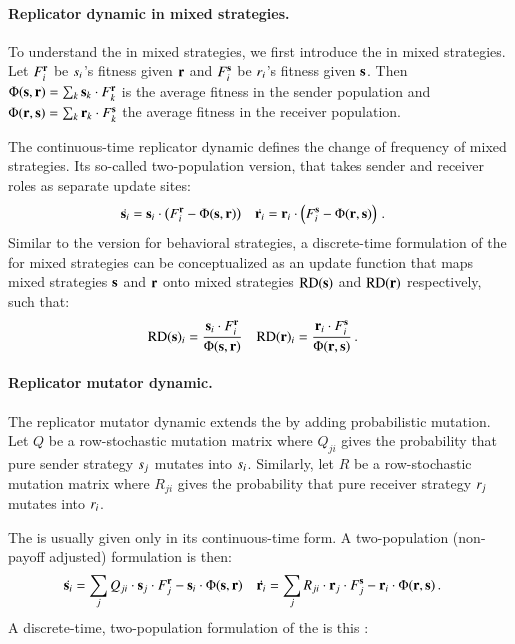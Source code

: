 \paragraph{Replicator dynamic in mixed strategies.} To understand the
\rmd in mixed strategies, we first introduce the \rd in mixed
strategies. Let $F_i^{\mathrm{\mathbf{r}}}$ be $s_i$'s fitness given
$\mathrm{\mathbf{r}}$ and $F_i^{\mathrm{\mathbf{s}}}$ be $r_i$'s fitness given
$\mathrm{\mathbf{s}}$. Then $\Phi(\mathrm{\mathbf{s}},\mathrm{\mathbf{r}}) = \sum_{k} \mathrm{\mathbf{s}}_k \cdot
F_k^{\mathrm{\mathbf{r}}}$ is the average fitness in the sender population and
$\Phi(\mathrm{\mathbf{r}},\mathrm{\mathbf{s}}) = \sum_{k} \mathrm{\mathbf{r}}_k \cdot F_k^{\mathrm{\mathbf{s}}}$ the
average fitness in the receiver population.

The continuous-time replicator dynamic defines the change of frequency
of mixed strategies. Its so-called two-population version, that takes
sender and receiver roles as separate update sites:
\begin{align*}
  \dot{\mathrm{\mathbf{s}}_i} & = \mathrm{\mathbf{s}}_i \cdot \left ( F_i^{\mathrm{\mathbf{r}}} -
  \Phi(\mathrm{\mathbf{s}},\mathrm{\mathbf{r}}) \right ) &   \dot{\mathrm{\mathbf{r}}_i} &  = \mathrm{\mathbf{r}}_i \cdot \left ( F_i^{\mathrm{\mathbf{s}}} -
  \Phi(\mathrm{\mathbf{r}},\mathrm{\mathbf{s}}) \right ) \,.
\end{align*}
Similar to the version for behavioral strategies, a discrete-time
formulation of the \rd for mixed strategies can be conceptualized as an
update function that maps mixed strategies $\mathrm{\mathbf{s}}$ and $\mathrm{\mathbf{r}}$
onto mixed strategies $\mathrm{RD}(\mathrm{\mathbf{s}})$ and $\mathrm{RD}(\mathrm{\mathbf{r}})$ respectively,
such that:
\begin{align*}
  \mathrm{RD}(\mathrm{\mathbf{s}})_i & = \frac{\mathrm{\mathbf{s}}_i \cdot F_i^{\mathrm{\mathbf{r}}}}{
    \Phi(\mathrm{\mathbf{s}},\mathrm{\mathbf{r}})} & \mathrm{RD}(\mathrm{\mathbf{r}})_i & = \frac{\mathrm{\mathbf{r}}_i \cdot
    F_i^{\mathrm{\mathbf{s}}}}{ \Phi(\mathrm{\mathbf{r}},\mathrm{\mathbf{s}})} \,.
\end{align*}


\paragraph{Replicator mutator dynamic.} The replicator mutator dynamic
extends the \rd by adding probabilistic mutation. Let $Q$ be a
row-stochastic mutation matrix where $Q_{ji}$ gives the probability
that pure sender strategy $s_j$ mutates into
$s_i$. Similarly, let $R$ be a row-stochastic mutation matrix
where $R_{ji}$ gives the probability that pure receiver strategy
$r_j$ mutates into $r_i$.

The \rmd is usually given only in its continuous-time form. A
two-population (non-payoff adjusted) formulation is then:
\begin{align*}
  \dot{\mathrm{\mathbf{s}}_i} & = \sum_{j}  Q_{ji} \cdot \mathrm{\mathbf{s}}_j
    \cdot F_j^{\mathrm{\mathbf{r}}} - \mathrm{\mathbf{s}}_i \cdot \Phi(\mathrm{\mathbf{s}},\mathrm{\mathbf{r}}) &
    \dot{\mathrm{\mathbf{r}}_i} & = \sum_{j}  R_{ji} \cdot \mathrm{\mathbf{r}}_j
    \cdot F_j^{\mathrm{\mathbf{s}}} - \mathrm{\mathbf{r}}_i \cdot \Phi(\mathrm{\mathbf{r}},\mathrm{\mathbf{s}}) \,.
\end{align*}
A discrete-time, two-population formulation of the \rmd is this 
\citep[c.f.][97]{PageNowak2002:Unifying-Evolut}:

